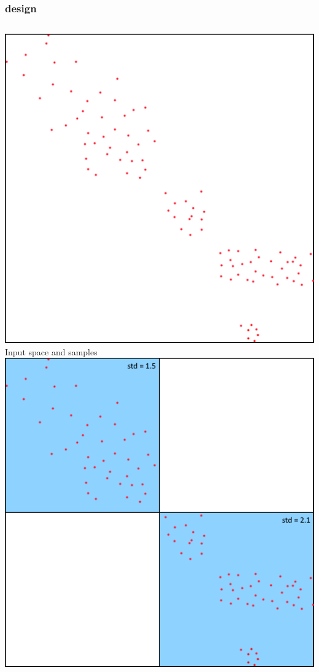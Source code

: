 \documentclass[presentation]{beamer}
\begin{document}

\begin{frame}
\frametitle{\gridex design}
	\begin{columns}[t]
			\centering
			\includegraphics[width = \columnwidth]{img/demo/1.pdf}\\
			\scriptsize Input space and samples
			\centering
			\includegraphics[width = \columnwidth]{img/demo/2.pdf}\\

\end{columns}
\end{frame}
\end{document}
